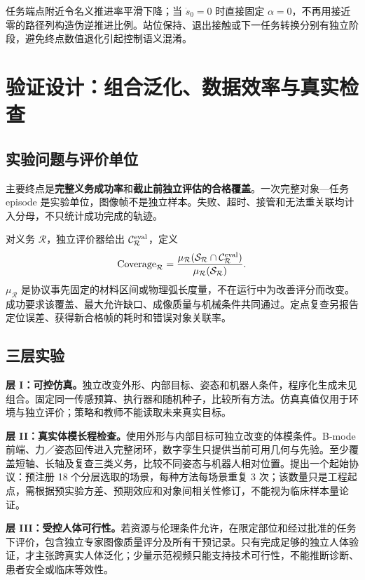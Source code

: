 \documentclass[UTF8,11pt,a4paper,fontset=fandol]{ctexart}
\numberwithin{equation}{section}
\theoremstyle{definition}
\begin{document}
任务端点附近令名义推进率平滑下降；当 $\dot s_0=0$ 时直接固定 $\alpha=0$，不再用接近零的路径列构造伪逆推进比例。站位保持、退出接触或下一任务转换分别有独立阶段，避免终点数值退化引起控制语义混淆。

\section{验证设计：组合泛化、数据效率与真实检查}
\label{sec:experiments}
\subsection{实验问题与评价单位}
主要终点是\textbf{完整义务成功率}和\textbf{截止前独立评估的合格覆盖}。一次完整对象—任务 episode 是实验单位，图像帧不是独立样本。失败、超时、接管和无法重关联均计入分母，不只统计成功完成的轨迹。

对义务 $\mathcal R$，独立评价器给出 $\mathcal C^{\rm eval}_{\mathcal R}$，定义
\begin{equation}
\mathrm{Coverage}_{\mathcal R}
=\frac{\mu_{\mathcal R}(\mathcal S_{\mathcal R}\cap\mathcal C^{\rm eval}_{\mathcal R})}
{\mu_{\mathcal R}(\mathcal S_{\mathcal R})}.
\label{eq:covermetric}
\end{equation}
$\mu_{\mathcal R}$ 是协议事先固定的材料区间或物理弧长度量，不在运行中为改善评分而改变。成功要求该覆盖、最大允许缺口、成像质量与机械条件共同通过。定点复查另报告定位误差、获得新合格帧的耗时和错误对象关联率。

\subsection{三层实验}
\textbf{层 I：可控仿真。}独立改变外形、内部目标、姿态和机器人条件，程序化生成未见组合。固定同一传感预算、执行器和随机种子，比较所有方法。仿真真值仅用于环境与独立评价；策略和教师不能读取未来真实目标。

\textbf{层 II：真实体模长程检查。}使用外形与内部目标可独立改变的体模条件。B-mode 前端、力／姿态回传进入完整闭环，数字孪生只提供当前可用几何与先验。至少覆盖短轴、长轴及复查三类义务，比较不同姿态与机器人相对位置。提出一个起始协议：预注册 18 个分层选取的场景，每种方法每场景重复 3 次；该数量只是工程起点，需根据预实验方差、预期效应和对象间相关性修订，不能视为临床样本量论证。

\textbf{层 III：受控人体可行性。}若资源与伦理条件允许，在限定部位和经过批准的任务下评价，包含独立专家图像质量评分及所有干预记录。只有完成足够的独立人体验证，才主张跨真实人体泛化；少量示范视频只能支持技术可行性，不能推断诊断、患者安全或临床等效性。
\end{document}
